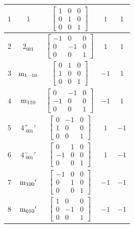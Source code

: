 \documentclass[fleqn,8pt]{jsarticle}
\begin{document}
\begin{longtable}{ccccc}
$ 1 $ & $ 1 $ & $ \begin{bmatrix} 1 & 0 & 0 \\ 0 & 1 & 0 \\ 0 & 0 & 1 \end{bmatrix} $ & $ 1 $ & $ 1 $ \\ \hline
$ 2 $ & $ 2{}_{001} $ & $ \begin{bmatrix} -1 & 0 & 0 \\ 0 & -1 & 0 \\ 0 & 0 & 1 \end{bmatrix} $ & $ 1 $ & $ 1 $ \\ \hline
$ 3 $ & $ {\rm m}_{1-10} $ & $ \begin{bmatrix} 0 & 1 & 0 \\ 1 & 0 & 0 \\ 0 & 0 & 1 \end{bmatrix} $ & $ -1 $ & $ 1 $ \\ \hline
$ 4 $ & $ {\rm m}_{110} $ & $ \begin{bmatrix} 0 & -1 & 0 \\ -1 & 0 & 0 \\ 0 & 0 & 1 \end{bmatrix} $ & $ -1 $ & $ 1 $ \\ \hline
$ 5 $ & $ 4^{+}_{\,\,001}{}' $ & $ \begin{bmatrix} 0 & -1 & 0 \\ 1 & 0 & 0 \\ 0 & 0 & 1 \end{bmatrix} $ & $ 1 $ & $ -1 $ \\ \hline
$ 6 $ & $ 4^{-}_{\,\,001}{}' $ & $ \begin{bmatrix} 0 & 1 & 0 \\ -1 & 0 & 0 \\ 0 & 0 & 1 \end{bmatrix} $ & $ 1 $ & $ -1 $ \\ \hline
$ 7 $ & $ {\rm m}_{100}{}' $ & $ \begin{bmatrix} -1 & 0 & 0 \\ 0 & 1 & 0 \\ 0 & 0 & 1 \end{bmatrix} $ & $ -1 $ & $ -1 $ \\ \hline
$ 8 $ & $ {\rm m}_{010}{}' $ & $ \begin{bmatrix} 1 & 0 & 0 \\ 0 & -1 & 0 \\ 0 & 0 & 1 \end{bmatrix} $ & $ -1 $ & $ -1 $ \\
\end{longtable}
\end{document}
